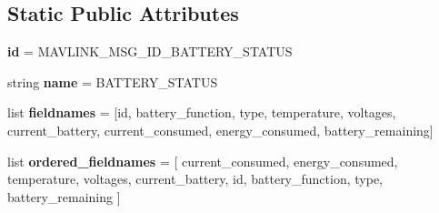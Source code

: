 \subsection*{Static Public Attributes}
\begin{DoxyCompactItemize}
\item 
\mbox{\label{classpymavlink_1_1dialects_1_1v10_1_1MAVLink__battery__status__message_a08a506799bf75f4faa472e1eeb8e960a}} 
{\bfseries id} = M\+A\+V\+L\+I\+N\+K\+\_\+\+M\+S\+G\+\_\+\+I\+D\+\_\+\+B\+A\+T\+T\+E\+R\+Y\+\_\+\+S\+T\+A\+T\+US
\item 
\mbox{\label{classpymavlink_1_1dialects_1_1v10_1_1MAVLink__battery__status__message_ae821f6ed6556adbab000c72c2d9622f0}} 
string {\bfseries name} = \textquotesingle{}B\+A\+T\+T\+E\+R\+Y\+\_\+\+S\+T\+A\+T\+US\textquotesingle{}
\item 
\mbox{\label{classpymavlink_1_1dialects_1_1v10_1_1MAVLink__battery__status__message_adfea56456ceaebfa7c4248c9bab50af1}} 
list {\bfseries fieldnames} = \mbox{[}\textquotesingle{}id\textquotesingle{}, \textquotesingle{}battery\+\_\+function\textquotesingle{}, \textquotesingle{}type\textquotesingle{}, \textquotesingle{}temperature\textquotesingle{}, \textquotesingle{}voltages\textquotesingle{}, \textquotesingle{}current\+\_\+battery\textquotesingle{}, \textquotesingle{}current\+\_\+consumed\textquotesingle{}, \textquotesingle{}energy\+\_\+consumed\textquotesingle{}, \textquotesingle{}battery\+\_\+remaining\textquotesingle{}\mbox{]}
\item 
\mbox{\label{classpymavlink_1_1dialects_1_1v10_1_1MAVLink__battery__status__message_a30a9b9e60be287048ebb64f672af6781}} 
list {\bfseries ordered\+\_\+fieldnames} = \mbox{[} \textquotesingle{}current\+\_\+consumed\textquotesingle{}, \textquotesingle{}energy\+\_\+consumed\textquotesingle{}, \textquotesingle{}temperature\textquotesingle{}, \textquotesingle{}voltages\textquotesingle{}, \textquotesingle{}current\+\_\+battery\textquotesingle{}, \textquotesingle{}id\textquotesingle{}, \textquotesingle{}battery\+\_\+function\textquotesingle{}, \textquotesingle{}type\textquotesingle{}, \textquotesingle{}battery\+\_\+remaining\textquotesingle{} \mbox{]}

\end{DoxyCompactItemize}
